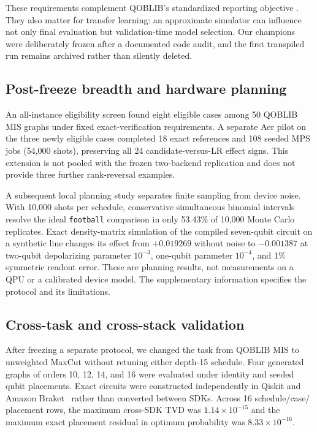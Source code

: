 \documentclass[10pt,twocolumn]{article}
\begin{document}
These requirements complement QOBLIB's standardized reporting objective
\cite{qoblib}. They also matter for transfer learning: an approximate simulator
can influence not only final evaluation but validation-time model selection.
Our champions were deliberately frozen after a documented code audit, and the
first transpiled run remains archived rather than silently deleted.

\subsection{Post-freeze breadth and hardware planning}

An all-instance eligibility screen found eight eligible cases among 50 QOBLIB
MIS graphs under fixed exact-verification requirements. A separate Aer pilot
on the three newly eligible cases completed 18 exact references and 108 seeded
MPS jobs (54,000 shots), preserving all 24 candidate-versus-LR effect signs.
This extension is not pooled with the frozen two-backend replication and
does not provide three further rank-reversal examples.

A subsequent local planning study separates finite sampling from device
noise. With 10,000 shots per schedule, conservative simultaneous binomial
intervals resolve the ideal \texttt{football} comparison in only 53.43\% of
10,000 Monte Carlo replicates. Exact density-matrix simulation of the compiled
seven-qubit circuit on a synthetic line changes its effect from $+0.019269$
without noise to $-0.001387$ at two-qubit depolarizing parameter $10^{-3}$,
one-qubit parameter $10^{-4}$, and 1\% symmetric readout error. These are
planning results, not measurements on a QPU or a calibrated device model.
The supplementary information specifies the protocol and its limitations.

\subsection{Cross-task and cross-stack validation}

After freezing a separate protocol, we changed the task from QOBLIB MIS to
unweighted MaxCut without retuning either depth-15 schedule. Four generated
graphs of orders 10, 12, 14, and 16 were evaluated under identity and seeded
qubit placements. Exact circuits were constructed independently in Qiskit and
Amazon Braket~\cite{braket} rather than converted between SDKs. Across 16 schedule/case/
placement rows, the maximum cross-SDK TVD was $1.14\times10^{-15}$ and the
maximum exact placement residual in optimum probability was
$8.33\times10^{-16}$.
\end{document}
